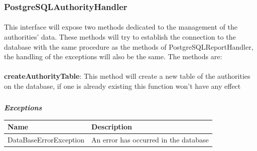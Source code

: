 				\subsubsection{PostgreSQLAuthorityHandler}
					\paragraph{}
						This interface will expose two methods dedicated to the management of the authorities' data. These methods will try to establish the connection to the database with the same procedure as the methods of PostgreSQLReportHandler, the handling of the exceptions will also be the same. The methods are:
							
							\paragraph{}
							\textbf{createAuthorityTable}: This method will create a new table of the authorities on the database, if one is already existing this function won't have any effect
							\subparagraph{}
							\vspace{-3mm}
								\textit{\textbf{Exceptions}}
								\vspace{-2mm}
									\begin{table}[!h]
									\begin{tabular}{ll}
										\toprule
										\textbf{Name} & \textbf{Description} \\
										\midrule
								  		DataBaseErrorException & An error has occurred in the database \\ 
								 		\bottomrule
									\end{tabular}
								\end{table}
								
